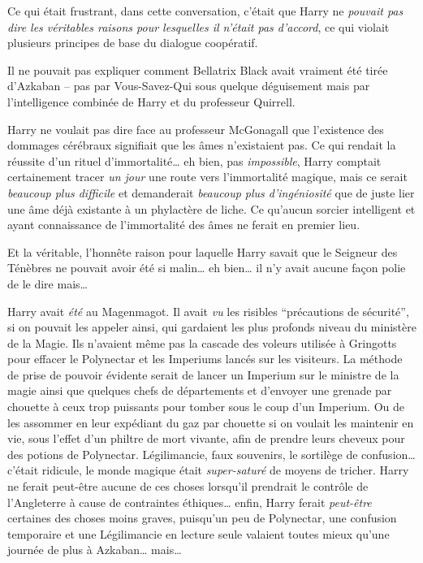 \later

Ce qui était frustrant, dans cette conversation, c'était que Harry ne \emph{pouvait pas dire les véritables raisons pour lesquelles il n'était pas d'accord}, ce qui violait plusieurs principes de base du dialogue coopératif.

Il ne pouvait pas expliquer comment Bellatrix Black avait vraiment été tirée d'Azkaban -- pas par Vous-Savez-Qui sous quelque déguisement mais par l'intelligence combinée de Harry et du professeur Quirrell.

Harry ne voulait pas dire face au professeur McGonagall que l'existence des dommages cérébraux signifiait que les âmes n'existaient pas. Ce qui rendait la réussite d'un rituel d'immortalité… eh bien, pas \emph{impossible}, Harry comptait certainement tracer \emph{un jour} une route vers l'immortalité magique, mais ce serait \emph{beaucoup plus difficile} et demanderait \emph{beaucoup plus d'ingéniosité} que de juste lier une âme déjà existante à un phylactère de liche. Ce qu'aucun sorcier intelligent et ayant connaissance de l'immortalité des âmes ne ferait en premier lieu.

Et la véritable, l'honnête raison pour laquelle Harry savait que le Seigneur des Ténèbres ne pouvait avoir été si malin… eh bien… il n'y avait aucune façon polie de le dire mais…

Harry avait \emph{été} au Magenmagot. Il avait \emph{vu} les risibles “précautions de sécurité”, si on pouvait les appeler ainsi, qui gardaient les plus profonds niveau du ministère de la Magie. Ils n'avaient même pas la cascade des voleurs utilisée à Gringotts pour effacer le Polynectar et les Imperiums lancés sur les visiteurs. La méthode de prise de pouvoir évidente serait de lancer un Imperium sur le ministre de la magie ainsi que quelques chefs de départements et d'envoyer une grenade par chouette à ceux trop puissants pour tomber sous le coup d'un Imperium. Ou de les assommer en leur expédiant du gaz par chouette si on voulait les maintenir en vie, sous l'effet d'un philtre de mort vivante, afin de prendre leurs cheveux pour des potions de Polynectar. Légilimancie, faux souvenirs, le sortilège de confusion… c'était ridicule, le monde magique était \emph{super-saturé} de moyens de tricher. Harry ne ferait peut-être aucune de ces choses lorsqu'il prendrait le contrôle de l'Angleterre à cause de contraintes éthiques… enfin, Harry ferait \emph{peut-être} certaines des choses moins graves, puisqu'un peu de Polynectar, une confusion temporaire et une Légilimancie en lecture seule valaient toutes mieux qu'une journée de plus à Azkaban… mais…

